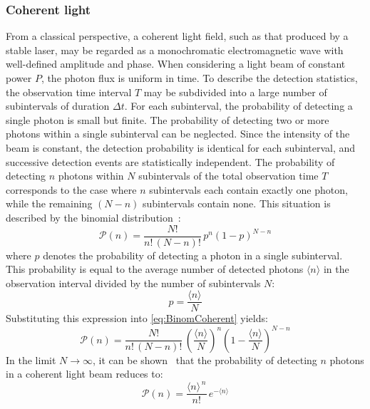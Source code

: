 \subsubsection{Coherent light}\label{sec:cohLight}
From a classical perspective, a coherent light field, such as that produced by a stable laser, may be regarded as a monochromatic electromagnetic wave with well-defined amplitude and phase. \newline
When considering a light beam of constant power $P$, the photon flux is uniform in time. To describe the detection statistics, the observation time interval $T$ may be subdivided into a large number of subintervals of duration $\Delta t$. For each subinterval, the probability of detecting a single photon is small but finite. The probability of detecting two or more photons within a single subinterval can be neglected. \newline
Since the intensity of the beam is constant, the detection probability is identical for each subinterval, and successive detection events are statistically independent.  \newline
The probability of detecting $n$ photons within $N$ subintervals of the total observation time $T$ corresponds to the case where $n$ subintervals each contain exactly one photon, while the remaining $(N-n)$ subintervals contain none. This situation is described by the binomial distribution~\cite{foxQuantumOpticsIntroduction2006}:
\begin{equation}
	\mathcal{P}(n) = \frac{N!}{n!\,(N-n)!}\,p^{n}(1-p)^{N-n}
	\label{eq:BinomCoherent}
\end{equation}
where $p$ denotes the probability of detecting a photon in a single subinterval. This probability is equal to the average number of detected photons $\langle n\rangle$ in the observation interval divided by the number of subintervals $N$:
\begin{equation}
	p = \frac{\langle n\rangle}{N}
\end{equation}
Substituting this expression into \autoref{eq:BinomCoherent} yields:
\begin{equation}
	\mathcal{P}(n) = \frac{N!}{n!\,(N-n)!}\,
	\left(\frac{\langle n\rangle}{N}\right)^{n}
	\left(1-\frac{\langle n\rangle}{N}\right)^{N-n}
\end{equation}
In the limit $N \to \infty$, it can be shown~\cite{foxQuantumOpticsIntroduction2006} that the probability of detecting $n$ photons in a coherent light beam reduces to:
\begin{equation}
	\mathcal{P}(n) = \frac{\langle n\rangle^{\,n}}{n!}\,e^{-\langle n\rangle}
\end{equation}
